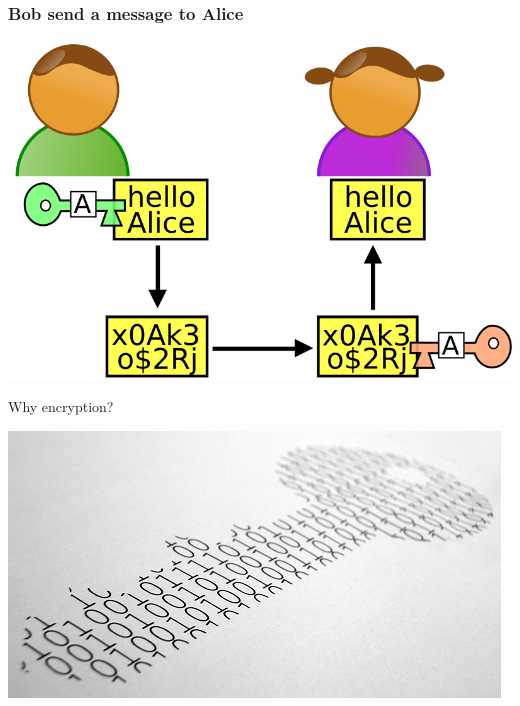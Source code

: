 \begin{frame}
\frametitle{Bob send a message to Alice}
\begin{center}
\includegraphics[scale=0.3] {./materials/Alice_et_bob.png} 
\end{center}
\end{frame}


\begin{frame}
\Huge{\centerline{Why encryption?}}
\begin{center}
\includegraphics[scale=0.4] {./materials/cryptography.jpg} 
\end{center}
\end{frame}

